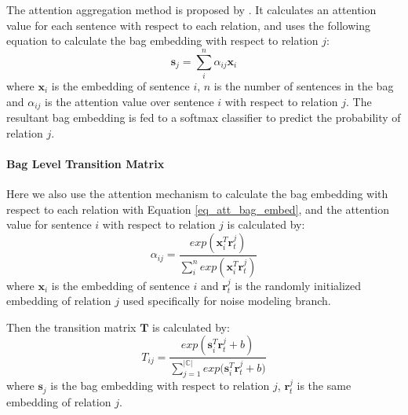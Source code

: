 The attention aggregation method is proposed by \cite{lin2016neural}. It calculates an attention value for each sentence with respect to each relation, and uses the following equation to calculate the bag embedding with respect to relation $j$:
\begin{equation}
\mathbf{s}_j = \sum_i^{n}{\alpha_{ij} \mathbf{x}_{i}}
\label{eq_att_bag_embed}
\end{equation}
where $\mathbf{x}_{i}$ is the embedding of sentence $i$, $n$ is the number of sentences in the bag and $\alpha_{ij}$ is the attention value over sentence $i$ with respect to relation $j$. The resultant bag embedding is fed to a softmax classifier to predict the probability of relation $j$.

\paragraph{Bag Level Transition Matrix}
 Here we also use the attention mechanism to calculate the bag embedding with respect to each relation with Equation \ref{eq_att_bag_embed}, and the attention value for sentence $i$ with respect to relation $j$ is calculated by:
\begin{equation}
\alpha_{ij} = \frac{exp(\mathbf{x}_i^T \mathbf{r}_t^j)}{\sum_i^n{exp(\mathbf{x}_i^T \mathbf{r}_t^j)}}
\end{equation}
where $\mathbf{x}_i$ is the embedding of sentence $i$ and $\mathbf{r}_t^j$ is the randomly initialized embedding of relation $j$ used specifically for noise modeling branch. 

Then the transition matrix $\mathbf{T}$ is calculated by:
\begin{equation}
T_{ij} = \frac{exp({\mathbf{s}_i^T \mathbf{r}_t^j  + b})}{\sum_{j=1}^{|\mathbb{C}|}{exp(\mathbf{s}_i^T \mathbf{r}_t^j + b})}
\end{equation}
where $\mathbf{s}_j$ is the bag embedding with respect to relation $j$, $\mathbf{r}_t^j$ is the same embedding of relation $j$. 


